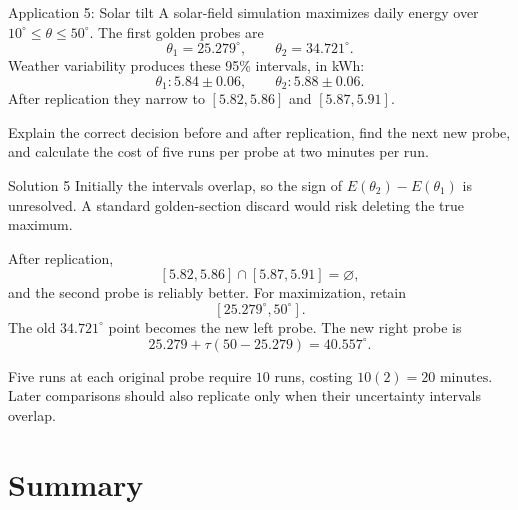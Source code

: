 \documentclass[aspectratio=169,11pt,t]{beamer}
\begin{document}
\begin{frame}{Application 5: Solar tilt}
  A solar-field simulation maximizes daily energy over
  \(10^\circ\le\theta\le50^\circ\). The first golden probes are
  \[
    \theta_1=25.279^\circ,
    \qquad \theta_2=34.721^\circ.
  \]
  Weather variability produces these 95\% intervals, in kWh:
  \[
    \theta_1: 5.84\pm0.06,
    \qquad
    \theta_2: 5.88\pm0.06.
  \]
  After replication they narrow to \([5.82,5.86]\) and \([5.87,5.91]\).

  Explain the correct decision before and after replication, find the next new
  probe, and calculate the cost of five runs per probe at two minutes per run.
\end{frame}

\begin{frame}{Solution 5}
  Initially the intervals overlap, so the sign of
  \(E(\theta_2)-E(\theta_1)\) is unresolved. A standard golden-section discard
  would risk deleting the true maximum.

  After replication,
  \[
    [5.82,5.86]\cap[5.87,5.91]=\varnothing,
  \]
  and the second probe is reliably better. For maximization, retain
  \[
    \boxed{[25.279^\circ,50^\circ]}.
  \]
  The old \(34.721^\circ\) point becomes the new left probe. The new right probe is
  \[
    25.279+\tau(50-25.279)=\boxed{40.557^\circ}.
  \]

  Five runs at each original probe require \(10\) runs, costing
  \(10(2)=\boxed{20\text{ minutes}}\). Later comparisons should also replicate
  only when their uncertainty intervals overlap.
\end{frame}

\section{Summary}
\end{document}

